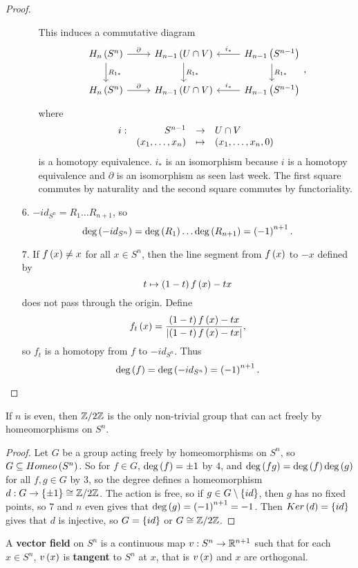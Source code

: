\begin{proof}
\begin{itemize}
\begin{itemize}[leftmargin=2cm]
This induces a commutative diagram
$$
\begin{tikzcd}
H_n\rb{S^n} \arrow{r}{\partial} \arrow{d}{R_{1*}} & H_{n - 1}\rb{U \cap V} \arrow{d}{R_{1*}} & H_{n - 1}\rb{S^{n - 1}}\arrow[swap]{l}{i_*} \arrow{d}{R_{1*}} \\
H_n\rb{S^n} \arrow{r}{\partial} & H_{n - 1}\rb{U \cap V} & H_{n - 1}\rb{S^{n - 1}}\arrow[swap]{l}{i_*}
\end{tikzcd},
$$
where
$$ \function[i]{S^{n - 1}}{U \cap V}{\rb{x_1, \dots, x_n}}{\rb{x_1, \dots, x_n, 0}} $$
is a homotopy equivalence. $ i_* $ is an isomorphism because $ i $ is a homotopy equivalence and $ \partial $ is an isomorphism as seen last week. The first square commutes by naturality and the second square commutes by functoriality.
\end{itemize}
\item[$ 6 $.] $ -id_{S^n} = R_1 \dots R_{n + 1} $, so
$$ \deg\left( -id_{S^n} \right) = \deg\left( R_1 \right) \dots \deg\left( R_{n + 1} \right) = \left( -1 \right)^{n + 1}. $$
\item[$ 7 $.] If $ f\left( x \right) \ne x $ for all $ x \in S^n $, then the line segment from $ f\left( x \right) $ to $ -x $ defined by
$$ t \mapsto \left( 1 - t \right)f\left( x \right) - tx $$
does not pass through the origin. Define
$$ f_t\left( x \right) = \dfrac{\left( 1 - t \right)f\left( x \right) - tx}{\left\lvert \left( 1 - t \right)f\left( x \right) - tx \right\rvert}, $$
so $ f_t $ is a homotopy from $ f $ to $ -id_{S^n} $. Thus
$$ \deg\left( f \right) = \deg\left( -id_{S^n} \right) = \left( -1 \right)^{n + 1}. $$
\end{itemize}
\end{proof}

\begin{proposition}
If $ n $ is even, then $ \mathbb{Z} / 2\mathbb{Z} $ is the only non-trivial group that can act freely by homeomorphisms on $ S^n $.
\end{proposition}

\begin{proof}
Let $ G $ be a group acting freely by homeomorphisms on $ S^n $, so $ G \subseteq Homeo\left( S^n \right) $. So for $ f \in G $, $ \deg\left( f \right) = \pm 1 $ by $ 4 $, and $ \deg\left( fg \right) = \deg\left( f \right)\deg\left( g \right) $ for all $ f, g \in G $ by $ 3 $, so the degree defines a homeomorphism $ d : G \to \left\{ \pm 1 \right\} \cong \mathbb{Z} / 2\mathbb{Z} $. The action is free, so if $ g \in G \setminus \left\{ id \right\} $, then $ g $ has no fixed points, so $ 7 $ and $ n $ even gives that $ \deg\left( g \right) = \left( -1 \right)^{n + 1} = -1 $. Then $ Ker\left( d \right) = \left\{ id \right\} $ gives that $ d $ is injective, so $ G = \left\{ id \right\} $ or $ G \cong \mathbb{Z} / 2\mathbb{Z} $.
\end{proof}

\begin{definition*}
A \textbf{vector field} on $ S^n $ is a continuous map $ v : S^n \to \mathbb{R}^{n + 1} $ such that for each $ x \in S^n $, $ v\left( x \right) $ is \textbf{tangent} to $ S^n $ at $ x $, that is $ v\left( x \right) $ and $ x $ are orthogonal.
\end{definition*}


